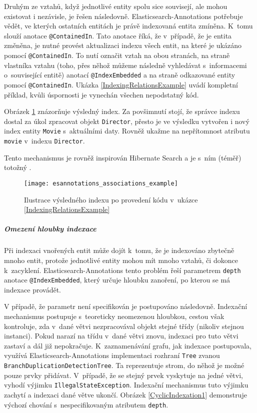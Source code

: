 \documentclass[11pt,oneside]{fithesis2}
\begin{document}
Druhým ze vztahů, když jednotlivé entity spolu sice souvisejí, ale mohou existovat i nezávisle, je řešen následovně. Elasticsearch-Annotations potřebuje vědět, ve kterých ostatních entitách je právě indexovaná entita zmíněna. K~tomu slouží anotace \texttt{@ContainedIn}. Tato anotace říká, že v~případě, že je entita změněna, je nutné provést aktualizaci indexu všech entit, na které je ukázáno pomocí \texttt{@ContainedIn}. To nutí označit vztah na obou stranách, na straně vlastníka vztahu (toho, přes něhož můžeme následně vyhledávat s~informacemi o~související entitě) anotací \texttt{@IndexEmbedded} a na straně odkazované entity pomocí \texttt{@ContainedIn}. Ukázka \ref{IndexingRelationsExample} uvádí kompletní příklad, kvůli úspornosti je vynechán všechen nepodstatný kód.

Obrázek \ref{IndexingRelationsExampleResult} znázorňuje výsledný index. Za povšimnutí stojí, že správce indexu dostal za úkol zpracovat objekt \texttt{Director}, přesto je ve výsledku vytvořen i nový index entity \texttt{Movie} s~aktuálními daty. Rovněž ukažme na nepřítomnost atributu \texttt{movie} v~indexu \texttt{Director}. 

Tento mechanismus je rovněž inspirován Hibernate Search a je s~ním (téměř) totožný \cite[str. 110]{HibernateSearchAction}. 

\begin{figure}[t]
	\begin{center}
		\texttt{[image: esannotations\_associations\_example]}
	\end{center}
	\caption{Ilustrace výsledného indexu po provedení kódu v~ukázce \ref{IndexingRelationsExample}}	
	\label{IndexingRelationsExampleResult}
\end{figure}

\subparagraph{Omezení hloubky indexace} Při indexaci vnořených entit může dojít k~tomu, že je indexováno zbytečně mnoho entit, protože jednotlivé entity mohou mít mnoho vztahů, či dokonce k~zacyklení. Elasticsearch-Annotations tento problém řeší parametrem \texttt{depth} anotace \texttt{@IndexEmbedded}, který určuje hloubku zanoření, po kterou se má indexace provádět. 

V případě, že parametr není specifikován je postupováno následovně. Indexační mechanismus postupuje s~teoreticky neomezenou hloubkou, cestou však kontroluje, zda v~dané větvi nezpracovával objekt stejné třídy (nikoliv stejnou instanci). Pokud narazí na třídu v~dané větvi znovu, indexaci pro tuto větvi zastaví a dál již nepokračuje. K~zaznamenávání grafu, jak indexace postupovala, využívá Elasticsearch-Annotations implementaci rozhraní \texttt{Tree} zvanou \texttt{BranchDuplicationDetectionTree}. Ta reprezentuje strom, do něhož je možné pouze prvky přidávat. V~případě, že se stejný prvek vyskytuje na jedné větvi, vyhodí výjimku \texttt{IllegalStateException}. Indexační mechanismus tuto výjimku zachytí a indexaci dané větve ukončí. Obrázek \ref{CyclicIndexation1} demonstruje výchozí chování s~nespecifikovaným atributem \texttt{depth}. 
\end{document}
